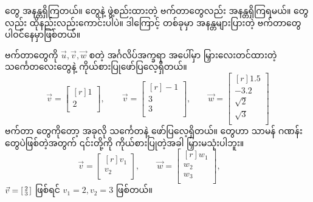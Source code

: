  တွေ အနန္တရှိကြတယ်။  တွေနဲ့ ဖွဲ့စည်းထားတဲ့  ဗက်တာတွေလည်း အနန္တရှိကြရမယ်။  တွေလည်း ထိုနည်းလည်းကောင်းပါပဲ။ ဒါကြောင့်  တစ်ခုမှာ အနန္တများပြားတဲ့ ဗက်တာတွေ ပါဝင်နေမှာဖြစ်တယ်။ 

ဗက်တာတွေကို \(\vec{u}, \vec{v}, \vec{w}\) စတဲ့ အင်္ဂလိပ်အက္ခရာ အပေါ်မှာ မြှားလေးတင်ထားတဲ့ သင်္ကေတလေးတွေနဲ့ ကိုယ်စားပြုဖော်ပြလေ့ရှိတယ်။
\[
\vec{v} = \begin{bmatrix*}[r] 1\\ 2\\ \end{bmatrix*}, \qquad
\vec{v} = \begin{bmatrix*}[r] -1\\ 3\\ 3\\\end{bmatrix*}, \qquad
\vec{w} = \begin{bmatrix*}[r] 1.5\\ -3.2\\ \sqrt{2}\\ \sqrt{3}\\\end{bmatrix*}
\]
ဗက်တာ  တွေကိုတော့ အခုလို သင်္ကေတနဲ့ ဖော်ပြလေ့ရှိတယ်။  တွေဟာ သာမန် ဂဏန်းတွေပဲဖြစ်တဲ့အတွက် ၎င်းတို့ကို ကိုယ်စားပြုတဲ့အခါ မြှားမသုံးပါဘူး။
\[
\vec{v} = \begin{bmatrix*}[r] v_{1} \\ v_{2} \\ \end{bmatrix*}, \qquad
\vec{w} = \begin{bmatrix*}[r] w_{1} \\ w_{2} \\ w_{3} \\ \end{bmatrix*}, \qquad
\]
\(\vec{v} = \begin{bsmallmatrix*}[r] 2 \\ 3\\ \end{bsmallmatrix*}\) ဖြစ်ရင် $v_{1}=2, v_{2}=3$ ဖြစ်တယ်။

